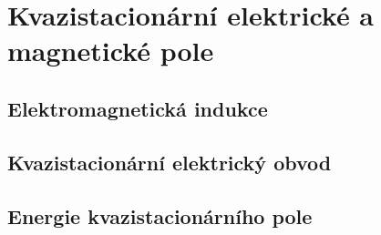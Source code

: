 \graphicspath{{../src/FYZ/img/}}
\setchaptertoc
\chapter{Kvazistacionární elektrické a magnetické pole}\label{fyz:IIIchapIV}
  \section{Elektromagnetická indukce}\label{fyz:IIIchapIVsecI}
  \section{Kvazistacionární elektrický obvod}\label{fyz:IIIchapIVsecII}
  \section{Energie kvazistacionárního pole}\label{fyz:IIIchapIVsecIII}

